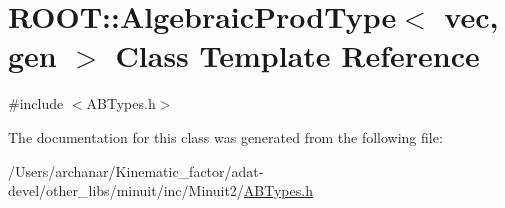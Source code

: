\hypertarget{classROOT_1_1Minuit2_1_1AlgebraicProdType_3_01vec_00_01gen_01_4}{}\section{R\+O\+OT\+:\+:Algebraic\+Prod\+Type$<$ vec, gen $>$ Class Template Reference}
\label{classROOT_1_1Minuit2_1_1AlgebraicProdType_3_01vec_00_01gen_01_4}


{\ttfamily \#include $<$A\+B\+Types.\+h$>$}



The documentation for this class was generated from the following file\+:\begin{DoxyCompactItemize}
\item 
/\+Users/archanar/\+Kinematic\+\_\+factor/adat-\/devel/other\+\_\+libs/minuit/inc/\+Minuit2/\mbox{\hyperlink{adat-devel_2other__libs_2minuit_2inc_2Minuit2_2ABTypes_8h}{A\+B\+Types.\+h}}\end{DoxyCompactItemize}
